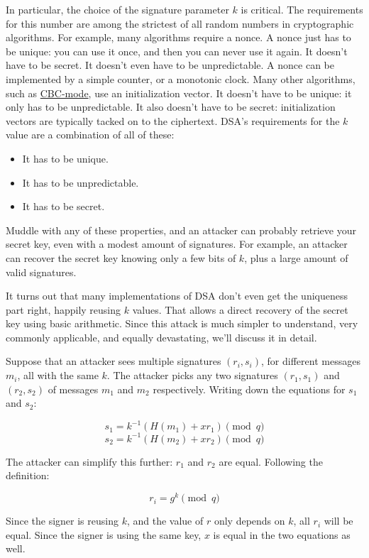 \documentclass[11pt,ebook,table,dvipsnames]{memoir}
\begin{document}
In particular, the choice of the signature parameter $k$ is critical.
The requirements for this number are among the strictest of all random
numbers in cryptographic algorithms. For example, many algorithms
require a \gls{nonce}. A nonce just has to be unique: you can use it
once, and then you can never use it again. It doesn't have to be
secret. It doesn't even have to be unpredictable. A nonce can be
implemented by a simple counter, or a monotonic clock. Many other
algorithms, such as \hyperref[CBC mode]{CBC-mode}, use an initialization vector. It doesn't
have to be unique: it only has to be unpredictable. It also doesn't
have to be secret: initialization vectors are typically tacked on to
the ciphertext. DSA's requirements for the $k$ value are a combination
of all of these:

\begin{itemize}
\item It has to be unique.
\item It has to be unpredictable.
\item It has to be secret.
\end{itemize}

Muddle with any of these properties, and an attacker can probably
retrieve your secret key, even with a modest amount of signatures. For
example, an attacker can recover the secret key knowing only a
few bits of $k$, plus a large amount of valid signatures.
\cite{nguyen:dsa}

It turns out that many implementations of DSA don't even get the
uniqueness part right, happily reusing $k$ values. That allows a
direct recovery of the secret key using basic arithmetic. Since this
attack is much simpler to understand, very commonly applicable, and
equally devastating, we'll discuss it in detail.

Suppose that an attacker sees multiple signatures $(r_i, s_i)$, for
different messages $m_i$, all with the same $k$. The attacker picks
any two signatures $(r_1, s_1)$ and $(r_2, s_2)$ of messages $m_1$ and
$m_2$ respectively. Writing down the equations for $s_1$ and $s_2$:

\[
s_1 = k^{-1} (H(m_1) + xr_1) \pmod q
\]
\[
s_2 = k^{-1} (H(m_2) + xr_2) \pmod q
\]

The attacker can simplify this further: $r_1$ and $r_2$ are equal.
Following the definition:

\[
r_i = g^k \pmod q
\]

Since the signer is reusing $k$, and the value of $r$ only depends on
$k$, all $r_i$ will be equal. Since the signer is using the same key,
$x$ is equal in the two equations as well.
\end{document}
